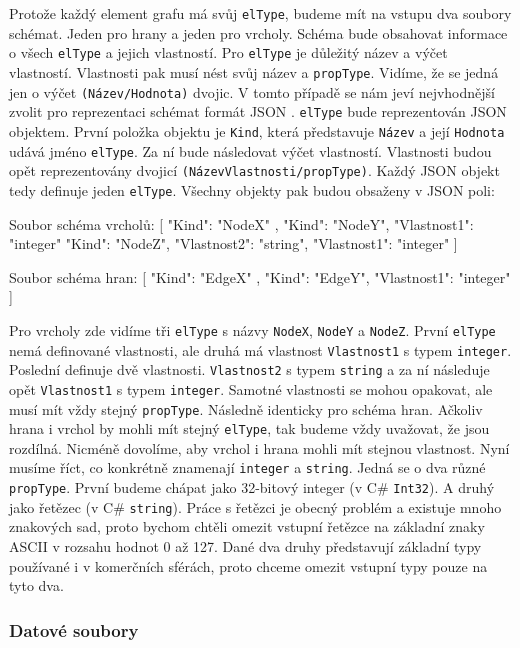 Protože každý element grafu má svůj \verb+elType+, budeme mít na vstupu dva soubory schémat. 
Jeden pro hrany a jeden pro vrcholy.
Schéma bude obsahovat informace o všech \verb+elType+ a jejich vlastností.
Pro \verb+elType+ je důležitý název a výčet vlastností.
Vlastnosti pak musí nést svůj název a \verb+propType+.
Vidíme, že se jedná jen o výčet \verb+(Název/Hodnota)+ dvojic.
V tomto případě se nám jeví nejvhodnější zvolit pro reprezentaci schémat formát JSON \citep{json}.
\verb+elType+ bude reprezentován JSON objektem. 
První položka objektu je \verb+Kind+, která představuje \texttt{Název} a její \texttt{Hodnota} udává jméno \verb+elType+.
Za ní bude následovat výčet vlastností.
Vlastnosti budou opět reprezentovány dvojicí \verb+(NázevVlastnosti/propType)+.
Každý JSON objekt tedy definuje jeden \texttt{elType}.
Všechny objekty pak budou obsaženy v JSON poli:
\begin{code}
Soubor schéma vrcholů:
[    { "Kind": "NodeX" }, 
     { "Kind": "NodeY", "Vlastnost1": "integer" } 
     { "Kind": "NodeZ", "Vlastnost2": "string", 
       "Vlastnost1": "integer" }  ]
\end{code}
\begin{code}
Soubor schéma hran:
[    { "Kind": "EdgeX" }, 
     { "Kind": "EdgeY", "Vlastnost1": "integer" } ]
\end{code}
Pro vrcholy zde vidíme tři \texttt{elType} s názvy \texttt{NodeX}, \texttt{NodeY} a \texttt{NodeZ}.
První \texttt{elType} nemá definované vlastnosti, ale druhá má vlastnost \texttt{Vlastnost1} s typem \texttt{integer}.
Poslední definuje dvě vlastnosti.
\texttt{Vlastnost2} s typem \texttt{string} a za ní následuje opět \texttt{Vlastnost1} s typem \texttt{integer}.
Samotné vlastnosti se mohou opakovat, ale musí mít vždy stejný \texttt{propType}.
Následně identicky pro schéma hran.
Ačkoliv hrana i vrchol by mohli mít stejný \texttt{elType}, tak budeme vždy uvažovat, že jsou rozdílná.
Nicméně dovolíme, aby vrchol i hrana mohli mít stejnou vlastnost.
Nyní musíme říct, co konkrétně znamenají \texttt{integer} a \texttt{string}.
Jedná se o dva různé \texttt{propType}.
První budeme chápat jako 32-bitový integer (v C\# \texttt{Int32}).
A druhý jako řetězec (v C\# \texttt{string}).
Práce s řetězci je obecný problém a existuje mnoho znakových sad, proto bychom chtěli omezit vstupní řetězce na základní znaky ASCII v rozsahu hodnot 0 až 127.  
Dané dva druhy představují základní typy používané i v komerčních sférách, proto chceme omezit vstupní typy pouze na tyto dva.

\subsubsection{Datové soubory}

